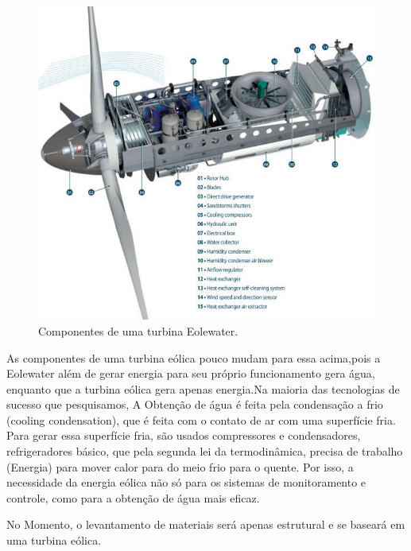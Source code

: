 \documentclass[12pt,openright,oneside,a4paper,brazil]{abntex2}
\begin{document}
\begin{figure}[!htbp]
\centering
\includegraphics[scale=0.6]{Componentes}
\caption[Caption title in LOF]{Componentes de uma turbina Eolewater.\footnotemark}
\FloatBarrier
\label{Max_Water}
\end{figure}


As componentes de uma turbina eólica pouco mudam para essa acima,pois a Eolewater além de gerar energia para seu próprio funcionamento gera água, enquanto que a turbina eólica gera apenas energia.Na maioria das tecnologias de sucesso que pesquisamos, A Obtenção de água é feita pela condensação  a frio (cooling condensation), que é feita com o contato de ar com uma superfície fria. Para gerar essa superfície fria, são usados compressores e condensadores, refrigeradores básico, que pela segunda lei da termodinâmica, precisa de trabalho (Energia) para mover calor para do meio frio para o quente. Por isso, a necessidade da energia eólica não só para os sistemas de monitoramento e controle, como para a obtenção de água mais eficaz. 

No Momento, o levantamento de materiais será apenas estrutural e se baseará em uma turbina eólica.
\end{document}
